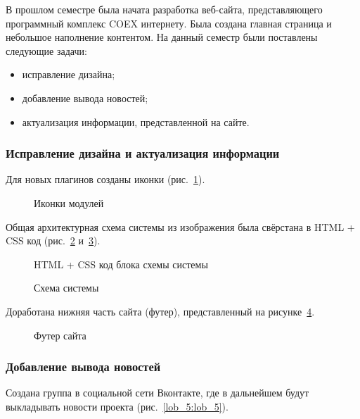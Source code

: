 В прошлом семестре была начата разработка веб-сайта, представляющего программный комплекс COEX интернету. Была создана главная страница и небольшое наполнение контентом. На данный семестр были поставлены следующие задачи:

\begin{itemize}
  \item исправление дизайна;
  \item добавление вывода новостей;
  \item актуализация информации, представленной на сайте.
\end{itemize}

\subsubsection{Исправление дизайна и актуализация информации}

Для новых плагинов созданы иконки (рис.~\ref{lob_1:lob_1}).

\begin{figure}[!ht]
\caption{Иконки модулей}
\label{lob_1:lob_1}
\end{figure}

Общая архитектурная схема системы из изображения была свёрстана в HTML + CSS код (рис.~\ref{lob_2:lob_2} и~\ref{lob_3:lob_3}).

\begin{figure}[!ht]
\caption{HTML + CSS код блока схемы системы}
\label{lob_2:lob_2}
\end{figure}

\begin{figure}[!ht]
\caption{Схема системы}
\label{lob_3:lob_3}
\end{figure}

Доработана нижняя часть сайта (футер), представленный на рисунке~\ref{lob_4:lob_4}.

\begin{figure}[!ht]
\caption{Футер сайта}
\label{lob_4:lob_4}
\end{figure}

\subsubsection{Добавление вывода новостей}

Создана группа в социальной сети Вконтакте, где в дальнейшем будут выкладывать новости проекта (рис.~\ref{lob_5:lob_5}).

